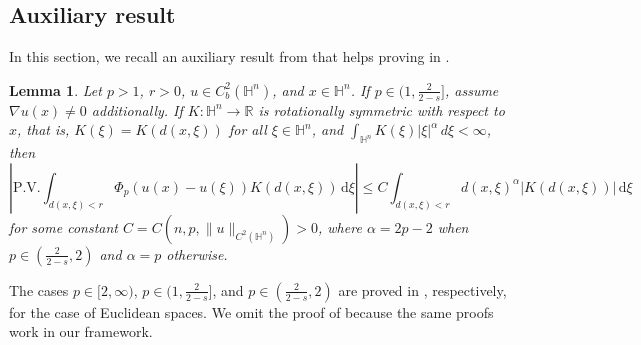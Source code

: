 \documentclass[11pt]{amsart}
\theoremstyle{plain}
\newtheorem{lemma}[theorem]{Lemma}
\theoremstyle{definition}
\numberwithin{equation}{section}
\begin{document}
\begin{appendix}


\section{Auxiliary result} \label{sec:appendix}


In this section, we recall an auxiliary result from \cite{dTGCV21} that helps proving  in .

\begin{lemma} \label{lem:appendix}
Let $p > 1$, $r > 0$, $u \in C^{2}_{b}(\mathbb{H}^{n})$, and $x \in \mathbb{H}^{n}$. If $p \in (1,\frac{2}{2-s}]$, assume $\nabla u(x) \neq 0$ additionally. If $K : \mathbb{H}^{n} \to \mathbb{R}$ is rotationally symmetric with respect to $x$, that is, $K(\xi)=K(d(x,\xi))$ for all $\xi \in \mathbb{H}^{n}$, and $\int_{\mathbb{H}^n} K(\xi)|\xi|^\alpha \,d\xi < \infty$, then
\begin{equation*}
\left| \mathrm{P.V.} \int_{d(x, \xi)<r} \Phi_{p}(u(x)-u(\xi)) K(d(x,\xi)) \,\mathrm{d}\xi \right| \leq C \int_{d(x, \xi)<r} d(x,\xi)^{\alpha} |K(d(x,\xi))| \,\mathrm{d}\xi
\end{equation*}
for some constant $C = C(n, p, \|u\|_{C^{2}(\mathbb{H}^{n})}) > 0$, where $\alpha = 2p-2$ when $p \in (\frac{2}{2-s}, 2)$ and $\alpha = p$ otherwise.
\end{lemma}

The cases $p \in [2, \infty)$, $p \in (1, \frac{2}{2-s}]$, and $p \in (\frac{2}{2-s}, 2)$                                                                                                                                                                        are proved in \cite[Lemma A.1, A2, and A3]{dTGCV21}, respectively, for the case of Euclidean spaces. We omit the proof of  because the same proofs work in our framework.

\end{appendix}

\end{document}
